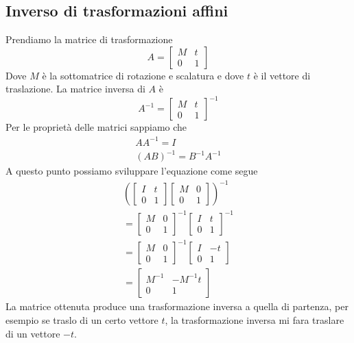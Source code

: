\subsection{Inverso di trasformazioni affini}
Prendiamo la matrice di trasformazione
\[
	A = \begin{bmatrix}
		M & t \\
		0 & 1
	\end{bmatrix}
\]
Dove $M$ \`e la sottomatrice di rotazione e scalatura e dove $t$ \`e il vettore di traslazione.
La matrice inversa di $A$ \`e
\[
	A^{-1} = \begin{bmatrix}
		M & t \\
		0 & 1
	\end{bmatrix}^{-1}
\]
Per le propriet\`a delle matrici sappiamo che
\begin{gather*}
	A A^{-1} = I \\
	(AB)^{-1} = B^{-1} A^{-1}
\end{gather*}
A questo punto possiamo sviluppare l'equazione come segue
\begin{gather*}
	\left(
	\begin{bmatrix}
		I & t \\
		0 & 1
	\end{bmatrix}
	\begin{bmatrix}
		M & 0 \\
		0 & 1
	\end{bmatrix}
	\right)^{-1} \\
	= \begin{bmatrix}
		M & 0 \\
		0 & 1
	\end{bmatrix}^{-1}
	\begin{bmatrix}
		I & t \\
		0 & 1
	\end{bmatrix}^{-1} \\
	= \begin{bmatrix}
		M & 0 \\
		0 & 1
	\end{bmatrix}^{-1}
	\begin{bmatrix}
		I & -t \\
		0 & 1
	\end{bmatrix} \\
	= \begin{bmatrix}
		M^{-1} & -M^{-1}t \\
		0      & 1
	\end{bmatrix}
\end{gather*}
La matrice ottenuta produce una trasformazione inversa a quella di partenza, per esempio se
traslo di un certo vettore $t$, la trasformazione inversa mi fara traslare di un vettore
$-t$.
